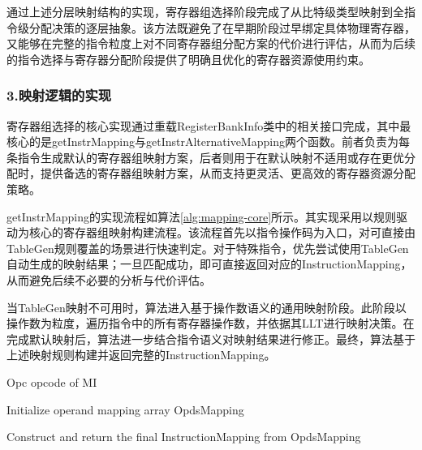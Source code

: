 通过上述分层映射结构的实现，寄存器组选择阶段完成了从比特级类型映射到全指令级分配决策的逐层抽象。该方法既避免了在早期阶段过早绑定具体物理寄存器，又能够在完整的指令粒度上对不同寄存器组分配方案的代价进行评估，从而为后续的指令选择与寄存器分配阶段提供了明确且优化的寄存器资源使用约束。


\subsubsection{3.映射逻辑的实现}
寄存器组选择的核心实现通过重载RegisterBankInfo类中的相关接口完成，其中最核心的是getInstrMapping与getInstrAlternativeMapping两个函数。前者负责为每条指令生成默认的寄存器组映射方案，后者则用于在默认映射不适用或存在更优分配时，提供备选的寄存器组映射方案，从而支持更灵活、更高效的寄存器资源分配策略。

\par

getInstrMapping的实现流程如算法\ref{alg:mapping-core}所示。其实现采用以规则驱动为核心的寄存器组映射构建流程。该流程首先以指令操作码为入口，对可直接由TableGen规则覆盖的场景进行快速判定。对于特殊指令，优先尝试使用TableGen自动生成的映射结果；一旦匹配成功，即可直接返回对应的InstructionMapping，从而避免后续不必要的分析与代价评估。

\par

当TableGen映射不可用时，算法进入基于操作数语义的通用映射阶段。此阶段以操作数为粒度，遍历指令中的所有寄存器操作数，并依据其LLT进行映射决策。在完成默认映射后，算法进一步结合指令语义对映射结果进行修正。最终，算法基于上述映射规则构建并返回完整的InstructionMapping。


\begin{algorithm}[htbp]
	\SetAlgoLined
	\linespread{1}\selectfont
	
	\caption{Core Logic of getInstrMapping}
	\label{alg:mapping-core}
	
	Opc \gets opcode of MI\;
	
	
	Initialize operand mapping array OpdsMapping\;
	
	\BlankLine
	
	\BlankLine
	
	
	\BlankLine
	Construct and return the final InstructionMapping from OpdsMapping\;
\end{algorithm}


